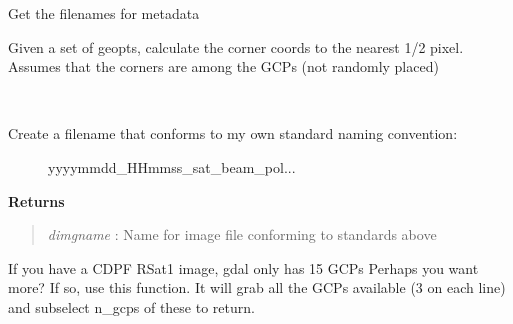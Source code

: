 \documentclass[letterpaper,10pt,openany,oneside]{sphinxmanual}
\begin{document}
\begin{fulllineitems}
\begin{fulllineitems}
\end{fulllineitems}


\begin{fulllineitems}
\label{code:Metadata.Metadata.getCEOSmetafile}
Get the filenames for metadata

\end{fulllineitems}


\begin{fulllineitems}
\label{code:Metadata.Metadata.getCornerPoints}
Given a set of geopts, calculate the corner coords to the nearest 1/2
pixel. Assumes that the corners are among the GCPs (not randomly placed)

\end{fulllineitems}


\begin{fulllineitems}
\label{code:Metadata.Metadata.getDimgname}~\begin{description}
\item[{Create a filename that conforms to my own standard naming convention:}] \leavevmode
yyyymmdd\_HHmmss\_sat\_beam\_pol...

\end{description}

\textbf{Returns}
\begin{quote}

\emph{dimgname} : Name for image file conforming to standards above
\end{quote}

\end{fulllineitems}


\begin{fulllineitems}
\label{code:Metadata.Metadata.getMoreGCPs}
If you have a CDPF RSat1 image, gdal only has 15 GCPs
Perhaps you want more?  If so, use this function.
It will grab all the GCPs available (3 on each line) and
subselect n\_gcps of these to return.


\end{fulllineitems}
\end{fulllineitems}
\end{document}
